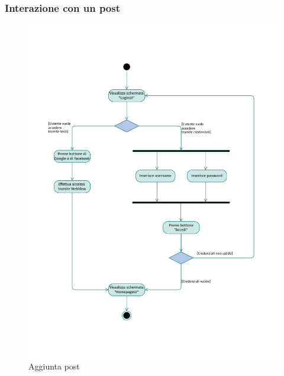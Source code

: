 \documentclass{natourDoc}
\begin{document}
	\subsubsection{Interazione con un post}
	\begin{figure}[!htbp]
		\centering
		\includegraphics[width=\textwidth, page=4]{./diagrams/activity.pdf}
		\caption{Aggiunta post}
	\end{figure}
	\FloatBarrier
\end{document}
